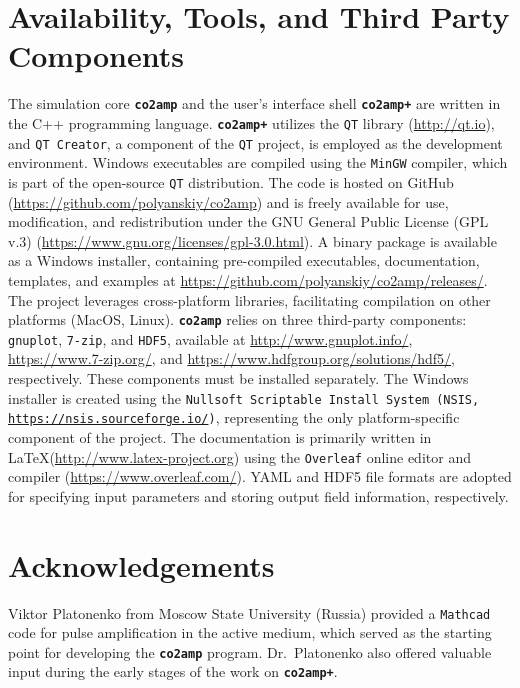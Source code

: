 \documentclass{report}
\begin{document}
\section{Availability, Tools, and Third Party Components}
The simulation core \textbf{\texttt{co2amp}} and the user's interface shell \textbf{\texttt{co2amp+}} are written in the C++ programming language. \textbf{\texttt{co2amp+}} utilizes the \texttt{QT} library (\url{http://qt.io}), and \texttt{QT Creator}, a component of the \texttt{QT} project, is employed as the development environment. Windows executables are compiled using the \texttt{MinGW} compiler, which is part of the open-source \texttt{QT} distribution. The code is hosted on GitHub (\url{https://github.com/polyanskiy/co2amp}) and is freely available for use, modification, and redistribution under the GNU General Public License (GPL v.3) (\url{https://www.gnu.org/licenses/gpl-3.0.html}). A binary package is available as a Windows installer, containing pre-compiled executables, documentation, templates, and examples at \url{https://github.com/polyanskiy/co2amp/releases/}. The project leverages cross-platform libraries, facilitating compilation on other platforms (MacOS, Linux). \textbf{\texttt{co2amp}} relies on three third-party components: \texttt{gnuplot}, \texttt{7-zip}, and \texttt{HDF5}, available at \url{http://www.gnuplot.info/}, \url{https://www.7-zip.org/}, and \url{https://www.hdfgroup.org/solutions/hdf5/}, respectively. These components must be installed separately. The Windows installer is created using the \texttt{Nullsoft Scriptable Install System (NSIS, \url{https://nsis.sourceforge.io/})}, representing the only platform-specific component of the project. The documentation is primarily written in \LaTeX (\url{http://www.latex-project.org}) using the \texttt{Overleaf} online editor and compiler (\url{https://www.overleaf.com/}). YAML and HDF5 file formats are adopted for specifying input parameters and storing output field information, respectively.



\section{Acknowledgements}
Viktor Platonenko from Moscow State University (Russia) provided a \texttt{Mathcad} code for pulse amplification in the  active medium, which served as the starting point for developing the \textbf{\texttt{co2amp}} program. Dr.~Platonenko also offered valuable input during the early stages of the work on \textbf{\texttt{co2amp+}}.
\end{document}
